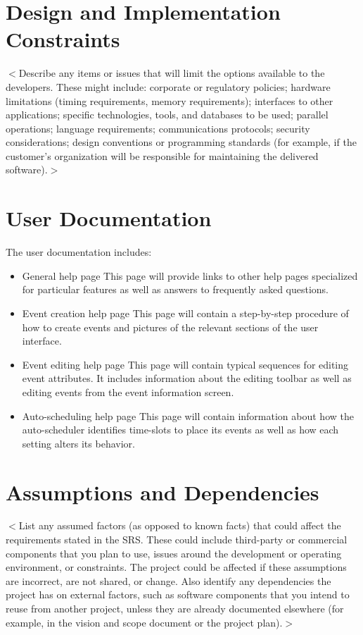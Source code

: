 \documentclass{scrreprt}
\begin{document}
\section{Design and Implementation Constraints}
$<$Describe any items or issues that will limit the options available to the 
developers. These might include: corporate or regulatory policies; hardware 
limitations (timing requirements, memory requirements); interfaces to other 
applications; specific technologies, tools, and databases to be used; parallel 
operations; language requirements; communications protocols; security 
considerations; design conventions or programming standards (for example, if the 
customer’s organization will be responsible for maintaining the delivered 
software).$>$

\section{User Documentation}
The user documentation includes: 
\begin{itemize}
    \item General help page\newline
    This page will provide links to other help pages specialized for particular
    features as well as answers to frequently asked questions.
    \item Event creation help page\newline
    This page will contain a step-by-step procedure of how to create events 
    and pictures of the relevant sections of the user interface.
    \item Event editing help page\newline
    This page will contain typical sequences for editing event attributes. It 
    includes information about the editing toolbar as well as editing events 
    from the event information screen.
    \item Auto-scheduling help page\newline
    This page will contain information about how the auto-scheduler identifies 
    time-slots to place its events as well as how each setting alters its behavior.
\end{itemize}

\section{Assumptions and Dependencies}

$<$List any assumed factors (as opposed to known facts) that could affect the 
requirements stated in the SRS. These could include third-party or commercial 
components that you plan to use, issues around the development or operating 
environment, or constraints. The project could be affected if these assumptions 
are incorrect, are not shared, or change. Also identify any dependencies the 
project has on external factors, such as software components that you intend to 
reuse from another project, unless they are already documented elsewhere (for 
example, in the vision and scope document or the project plan).$>$
\end{document}
